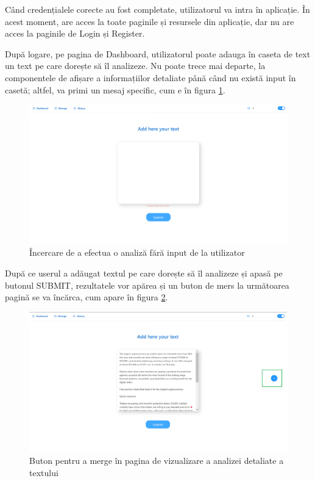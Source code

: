 Când credențialele corecte au fost completate, utilizatorul va intra în aplicație. În acest moment, are acces la toate paginile și resursele din aplicație, dar nu are acces la paginile de Login și Register. 

După logare, pe pagina de Dashboard, utilizatorul poate adauga în caseta de text un text pe care dorește să îl analizeze. Nu poate trece mai departe, la componentele de afișare a informațiilor detaliate
până când nu există input în casetă; altfel, va primi un mesaj specific, cum e în figura \ref{fig:dashboardInput}.
\begin{figure}[H]
	\centering
	\includegraphics[width=150mm]{figs/dashboardInput.png}
    \caption{Încercare de a efectua o analiză fără input de la utilizator}
	\label{fig:dashboardInput}
\end{figure}

După ce userul a adăugat textul pe care dorește să îl analizeze și apasă pe butonul SUBMIT, rezultatele vor apărea și un buton de mers la următoarea pagină se va încărca, cum apare în figura \ref{fig:seeMoreButton}.
\begin{figure}[H]
	\centering
	\includegraphics[width=150mm]{figs/seeMoreButton.png}
    \caption{Buton pentru a merge în pagina de vizualizare a analizei detaliate a textului}
	\label{fig:seeMoreButton}
\end{figure}

